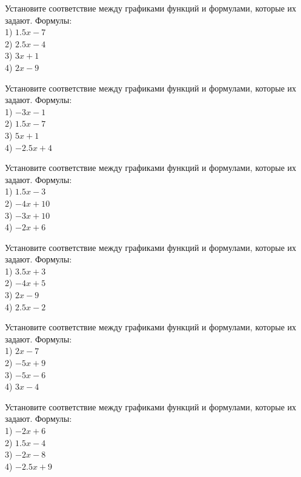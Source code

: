 \documentclass[4apaper]{article}
\begin{document}
\begin{taskBN}{61}
Установите соответствие между графиками функций и формулами, которые их задают. Формулы: \\1) $1.5x-7$\\2) $2.5x-4$\\3) $3x+1$\\4) $2x-9$
\end{taskBN}

\begin{taskBN}{62}
Установите соответствие между графиками функций и формулами, которые их задают. Формулы: \\1) $-3x-1$\\2) $1.5x-7$\\3) $5x+1$\\4) $-2.5x+4$
\end{taskBN}

\begin{taskBN}{63}
Установите соответствие между графиками функций и формулами, которые их задают. Формулы: \\1) $1.5x-3$\\2) $-4x+10$\\3) $-3x+10$\\4) $-2x+6$
\end{taskBN}

\begin{taskBN}{64}
Установите соответствие между графиками функций и формулами, которые их задают. Формулы: \\1) $3.5x+3$\\2) $-4x+5$\\3) $2x-9$\\4) $2.5x-2$
\end{taskBN}

\begin{taskBN}{65}
Установите соответствие между графиками функций и формулами, которые их задают. Формулы: \\1) $2x-7$\\2) $-5x+9$\\3) $-5x-6$\\4) $3x-4$
\end{taskBN}

\begin{taskBN}{66}
Установите соответствие между графиками функций и формулами, которые их задают. Формулы: \\1) $-2x+6$\\2) $1.5x-4$\\3) $-2x-8$\\4) $-2.5x+9$
\end{taskBN}
\end{document}
